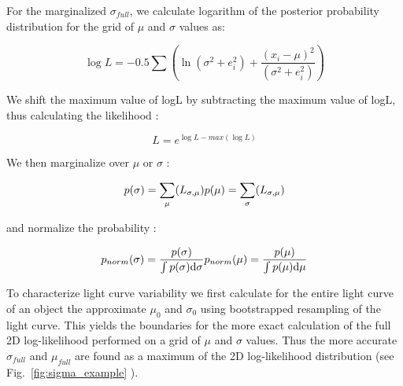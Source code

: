 \documentclass[fleqn,usenatbib]{mnras}  %
\begin{document}
For the marginalized $\sigma_{full}$, we calculate logarithm of the posterior probability distribution for the grid of $\mu$ and $\sigma$ values as:

\begin{equation}
\log{L} = -0.5 \sum \left( \ln(\sigma^{2}+e_{i}^{2}) + \frac{(x_{i}-\mu)^{2}}{(\sigma^{2}+e_{i}^{2})} \right)
\end{equation}

We shift the maximum value of logL by subtracting the maximum value of logL, thus calculating the likelihood : 

\begin{equation}
L = e^{\log{L} - max(\log{L})}
\end{equation}

We then marginalize over $\mu$ or $\sigma$ : 

\begin{equation}
p(\sigma) = \sum_{\mu}(L_{\sigma,\mu}) \\
p(\mu) = \sum_{\sigma}(L_{\sigma,\mu})
\end{equation}

and normalize the probability :

\begin{equation}
p_{norm}(\sigma) = \frac{p(\sigma)}{ \int {p(\sigma) \text{d}\sigma}} \\ 
p_{norm}(\mu) = \frac{p(\mu)} {\int {p(\mu) \text{d}\mu} }
\end{equation}


To characterize  light curve variability we first calculate for the entire light curve of an object  the approximate $\mu_{0}$ and $\sigma_{0}$ using bootstrapped resampling of the light curve.  This yields the boundaries for the more exact calculation of the full 2D log-likelihood performed on a grid of $\mu$ and $\sigma$ values. Thus the more accurate $\sigma_{full}$ and $\mu_{full}$ are found as a maximum of the 2D log-likelihood distribution (see Fig.~\ref{fig:sigma_example} ).








\bsp	%
\label{lastpage}
\end{document}
